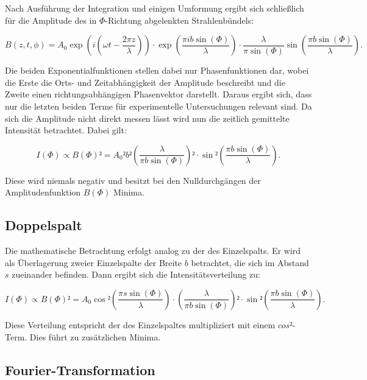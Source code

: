 Nach Ausführung der Integration und einigen Umformung ergibt sich schließlich für die Amplitude 
des in $\Phi$-Richtung abgelenkten Strahlenbündels: 

\begin{equation*}
B(z,t,\phi) = A_0 \exp{\left(i\left(\omega t - \frac{2\pi z}{\lambda}\right)\right)}\cdot \exp{\left(\frac{\pi i b \sin{(\Phi)}}{\lambda}\right)}\cdot
\frac{\lambda}{\pi \sin{(\Phi)}}\sin{\left(\frac{\pi b \sin{(\Phi)}}{\lambda}\right)}.
\end{equation*}

Die beiden Exponentialfunktionen stellen dabei nur Phasenfunktionen dar, wobei die Erste die Orts- und Zeitabhängigkeit 
der Amplitude beschreibt und die Zweite einen richtungsabhängigen Phasenvektor darstellt. Daraus ergibt sich, dass nur 
die letzten beiden Terme für experimentelle Untersuchungen relevant sind. Da sich die Amplitude nicht direkt 
messen lässt wird nun die zeitlich gemittelte Intensität betrachtet. Dabei gilt: 

\begin{equation}
I(\Phi) \propto B(\Phi)² = A_0² b² \left(\frac{\lambda}{\pi b \sin{(\Phi)}}\right)²\cdot \sin²{\left(\frac{\pi b \sin{(\Phi)}}{\lambda}\right)}.
\label{eqn:einfach}
\end{equation}

Diese wird niemals negativ und besitzt bei den Nulldurchgängen der Amplitudenfunktion $B(\Phi)$ Minima. 

\subsection{Doppelspalt}

Die mathematische Betrachtung erfolgt analog zu der des Einzelspalts. Er wird als Überlagerung zweier Einzelspalte
der Breite $b$ betrachtet, die sich im Abstand $s$ zueinander befinden. Dann ergibt sich die Intensitätsverteilung
zu: 

\begin{equation}
I(\Phi) \propto B(\Phi)² = A_0 \cos²{\left(\frac{\pi s \sin{(\Phi)}}{\lambda}\right)}\cdot \left(\frac{\lambda}{\pi b \sin{(\Phi)}}\right)² 
\cdot \sin²{\left(\frac{\pi b \sin{(\Phi)}}{\lambda}\right)}. 
\label{eqn:doppel}
\end{equation}

Diese Verteilung entspricht der des Einzelspaltes multipliziert mit einem $cos²$-Term. Dies führt zu zusätzlichen
Minima. 

\subsection{Fourier-Transformation}

